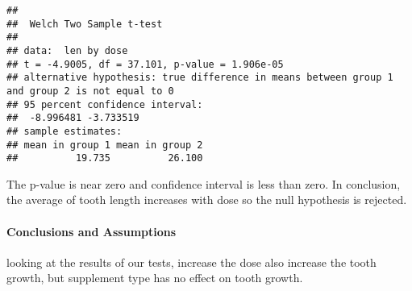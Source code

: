 \documentclass[
]{article}
\newenvironment{Shaded}{\begin{snugshade}}{\end{snugshade}}
\newcommand{\DecValTok}[1]{\textcolor[rgb]{0.00,0.00,0.81}{#1}}
\newcommand{\FunctionTok}[1]{\textcolor[rgb]{0.00,0.00,0.00}{#1}}
\newcommand{\NormalTok}[1]{#1}
\newcommand{\SpecialCharTok}[1]{\textcolor[rgb]{0.00,0.00,0.00}{#1}}
\begin{document}
\begin{Shaded}
\end{Shaded}

\begin{verbatim}
## 
##  Welch Two Sample t-test
## 
## data:  len by dose
## t = -4.9005, df = 37.101, p-value = 1.906e-05
## alternative hypothesis: true difference in means between group 1 and group 2 is not equal to 0
## 95 percent confidence interval:
##  -8.996481 -3.733519
## sample estimates:
## mean in group 1 mean in group 2 
##          19.735          26.100
\end{verbatim}

The p-value is near zero and confidence interval is less than zero. In
conclusion, the average of tooth length increases with dose so the null
hypothesis is rejected.

\hypertarget{conclusions-and-assumptions}{%
\paragraph{Conclusions and
Assumptions}\label{conclusions-and-assumptions}}

looking at the results of our tests, increase the dose also increase the
tooth growth, but supplement type has no effect on tooth growth.
\end{document}
